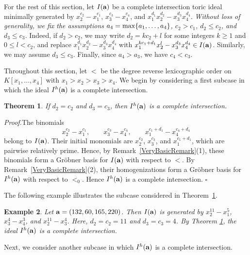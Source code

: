 \documentclass[10pt]{amsart}
\newtheorem{thm1}{Theorem}[section]
\newtheorem{ex1}[thm1]{Example}
\begin{document}
 For the rest of this section, let $I({\bf a})$ be a complete intersection toric ideal minimally generated by $x_{2}^{c_2}-x_{1}^{c_1}$, $x_{3}^{c_3}-x_{4}^{c_4}$, and $x_{1}^{d_1}x_{2}^{d_2}-x_{3}^{d_3}x_{4}^{d_4}$. {\em Without loss of generality, we fix the assumptions $a_{4}={\rm max}\{a_1,\ldots,a_4\}$, $c_2>c_1$, $d_2 \leq c_2$, and $d_3 \leq c_3$.} Indeed, if $d_2>c_2$, we may write $d_{2}=kc_2+l$ for some integers $k \geq 1$ and $0 \leq l<c_2$, and replace $x_{1}^{d_1}x_{2}^{d_2}-x_{3}^{d_3}x_{4}^{d_4}$ with $x_{1}^{kc_1+d_1}x_{2}^{l}-x_{3}^{d_3}x_{4}^{d_4} \in I({\bf a})$. Similarly, we may assume $d_3 \leq c_3$. Finally, since $a_4>a_3$, we have $c_4<c_3$.

Throughout this section, let $<$ be the degree reverse lexicographic order on $K[x_1, \ldots, x_4]$ with $x_1 > x_2 > x_3 > x_4$. We begin by considering a first subcase in which the ideal $I^{h}({\bf a})$ is a complete intersection. \vspace{-0.25\baselineskip}

\begin{thm1} \label{BAS1} If $d_2=c_2$ and $d_3=c_3$, then $I^{h}({\bf a})$ is a complete intersection.
\end{thm1}
\vspace{-0.25\baselineskip}
{\em \noindent Proof.}The binomials
\[
x_2^{c_2}-x_1^{c_1},\qquad
x_3^{c_3}-x_4^{c_4},\qquad
x_1^{c_1+d_1}-x_4^{c_4+d_4}
\]
belong to $I({\bf a})$.
Their initial monomials are
$x_2^{c_2}$,
$x_3^{c_3}$,
and
$x_1^{c_1+d_1}$,
which are pairwise relatively prime.
Hence, by Remark~\ref{VeryBasicRemark}(1), these binomials form a
Gr\"obner basis for $I({\bf a})$ with respect to $<$.
By Remark~\ref{VeryBasicRemark}(2), their homogenizations form a
Gr\"obner basis for $I^h({\bf a})$ with respect to $<_0$.
Hence $I^h({\bf a})$ is a complete intersection.
\hfill $\square$ \par\vspace{0.5\baselineskip}

The following example illustrates the subcase considered in Theorem~\ref{BAS1}.

\begin{ex1} {\rm Let ${\bf a}=(132, 60, 165, 220)$. Then $I({\bf a})$ is generated by $x_{2}^{11}-x_{1}^{5}$, $x_3^{4}-x_{4}^{3}$, and $x_{2}^{11}-x_{3}^{4}$. Here, $d_{2}=c_2=11$ and $d_{3}=c_3=4$. By Theorem \ref{BAS1}, the ideal $I^{h}({\bf a})$ is a complete intersection.}
\end{ex1}

Next, we consider another subcase in which $I^{h}({\bf a})$ is a complete intersection.
\end{document}
